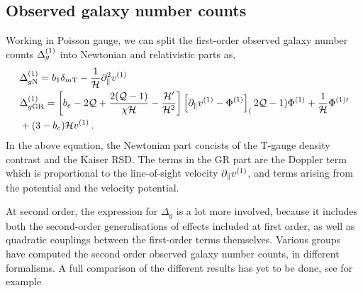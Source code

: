 \subsection{Observed galaxy number counts}
Working in Poisson gauge, we can split the first-order observed galaxy number counts $\Delta_g^{(1)}$ into Newtonian and relativistic parts as, 
\begin{align}
	&\Delta_{g\mathrm{N}}^{(1)} = b_1 \delta_{m\mathrm{T}} - \frac{1}{\mathcal{H}} \partial_\parallel^2 v^{(1)}\,\\
	&\Delta_{g\mathrm{GR}}^{(1)} = \left[ b_e - 2 \mathcal{Q} + \frac{2 (\mathcal{Q} - 1)}{\chi \mathcal{H}} - \frac{\mathcal{H}'}{\mathcal{H}^2} \right] \left[ \partial_\parallel v^{(1)} - \Phi^{(1)} \right] _ (2 \mathcal{Q} - 1) \Phi^{(1)} + \frac{1}{\mathcal{H}} \Phi^{{(1)} \prime} \nonumber \\
	& + (3 - b_e) \mathcal{H} v^{(1)}\,.
\end{align}
In the above equation, the Newtonian part concists of the T-gauge density contrast and the Kaiser RSD. The terms in the GR part are the Doppler term which is proportional to the line-of-sight velocity $\partial_\parallel v^{(1)}$, and terms arising from the potential and the velocity potential. 

At second order, the expression for $\Delta_g$ is a lot more involved, because it includes both the second-order generalisations of effects included at first order, as well as quadratic couplings between the first-order terms themselves. Various groups have computed the second order observed galaxy number counts, in different formalisms. A full comparison of the different results has yet to be done, see for example

